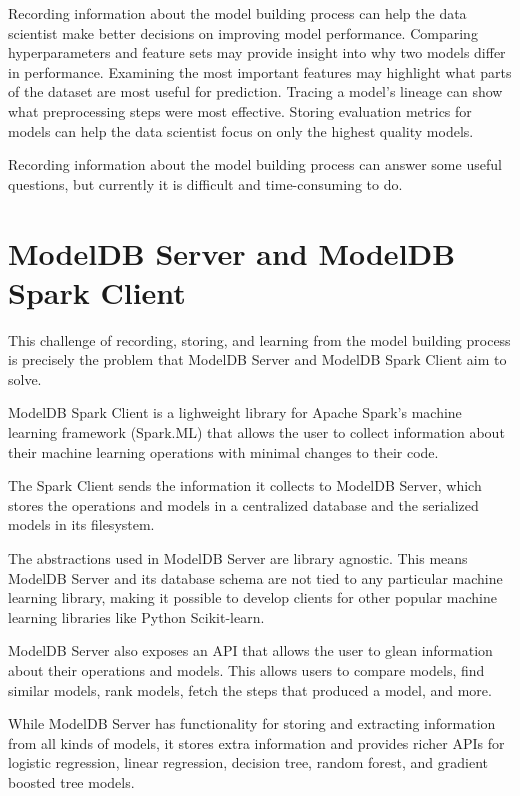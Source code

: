 Recording information about the model building process can help the data scientist 
make better decisions on improving model performance. Comparing hyperparameters
and feature sets may provide insight into why two models differ in performance. 
Examining the most important features may highlight what parts of the dataset are
most useful for prediction. Tracing a model's lineage can show what preprocessing
steps were most effective. Storing evaluation metrics for models can help
the data scientist focus on only the highest quality models. 

Recording information about the model building process can answer some useful 
questions, but currently it is difficult and time-consuming to do.

\section{ModelDB Server and ModelDB Spark Client}

This challenge of recording, storing, and learning from the model building process is precisely
the problem that ModelDB Server and ModelDB Spark Client aim to solve.

ModelDB Spark Client is a lighweight library for Apache Spark's machine learning framework (Spark.ML) 
that allows the user to collect information about their machine learning operations with minimal changes to their code. 

The Spark Client sends the information it collects to ModelDB Server, which 
stores the operations and models in a centralized database and the serialized 
models in its filesystem. 

The abstractions used in ModelDB Server are library agnostic. This means ModelDB Server 
and its database schema are not tied to any particular machine learning library, making
it possible to develop clients for other popular machine learning libraries like Python Scikit-learn.

ModelDB Server also exposes an API that allows the user to glean information about their
operations and models. This allows users to compare models, find
similar models, rank models, fetch the steps that produced a model, and more. 

While ModelDB Server has functionality for storing and extracting information from
all kinds of models, it stores extra information and provides richer APIs for 
logistic regression, linear regression, decision tree, random forest, and 
gradient boosted tree models. 

